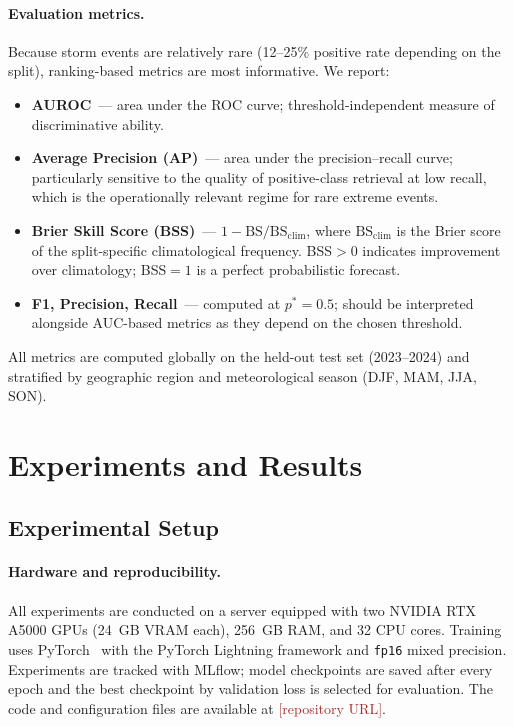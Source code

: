 \documentclass{article}
\begin{document}
\paragraph{Evaluation metrics.}
Because storm events are relatively rare (12--25\% positive rate depending on the split), ranking-based metrics are most informative. We report:
\begin{itemize}
    \item \textbf{AUROC}~--- area under the ROC curve; threshold-independent measure of discriminative ability.
    \item \textbf{Average Precision (AP)}~--- area under the precision--recall curve; particularly sensitive to the quality of positive-class retrieval at low recall, which is the operationally relevant regime for rare extreme events.
    \item \textbf{Brier Skill Score (BSS)}~--- $1 - \mathrm{BS}/\mathrm{BS}_{\mathrm{clim}}$, where $\mathrm{BS}_{\mathrm{clim}}$ is the Brier score of the split-specific climatological frequency. BSS$>0$ indicates improvement over climatology; BSS$=1$ is a perfect probabilistic forecast.
    \item \textbf{F1, Precision, Recall}~--- computed at $p^* = 0.5$; should be interpreted alongside AUC-based metrics as they depend on the chosen threshold.
\end{itemize}
All metrics are computed globally on the held-out test set (2023--2024) and stratified by geographic region and meteorological season (DJF, MAM, JJA, SON).

\section{Experiments and Results}
\label{sec:experiments}

\subsection{Experimental Setup}

\paragraph{Hardware and reproducibility.}
All experiments are conducted on a server equipped with two NVIDIA RTX A5000 GPUs (24~GB VRAM each), 256~GB RAM, and 32 CPU cores. Training uses PyTorch~\cite{paszke2019pytorch} with the PyTorch Lightning framework and \texttt{fp16} mixed precision. Experiments are tracked with MLflow; model checkpoints are saved after every epoch and the best checkpoint by validation loss is selected for evaluation. The code and configuration files are available at \textcolor{brown}{[repository URL]}.
\end{document}
